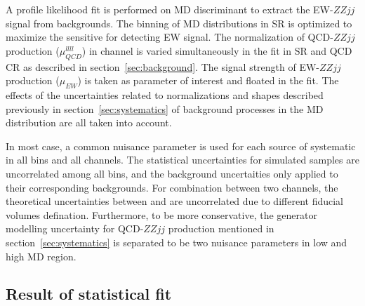 A profile likelihood fit is performed on MD discriminant to extract the EW-$ZZjj$ signal from backgrounds.
The binning of MD distributions in SR is optimized to maximize the sensitive for detecting EW signal.
The normalization of QCD-$ZZjj$ production ($\mu_{QCD}^{llll}$) in \llll channel is varied simultaneously in the fit in SR and QCD CR as described in section~\ref{sec:background}.
The signal strength of EW-$ZZjj$ production ($\mu_{EW}$) is taken as parameter of interest and floated in the fit.
The effects of the uncertainties related to normalizations and shapes described previously in section~\ref{sec:systematics} 
of background processes in the MD distribution are all taken into account.

In most case, a common nuisance parameter is used for each source of systematic in all bins and all channels.
The statistical uncertainties for simulated samples are uncorrelated among all bins, and the background uncertaities only applied to their corresponding backgrounds.
For combination between two channels, the theoretical uncertainties between \llll and \llvv are uncorrelated due to different fiducial volumes defination.
Furthermore, to be more conservative, the generator modelling uncertainty for QCD-$ZZjj$ production mentioned in section~\ref{sec:systematics}
is separated to be two nuisance parameters in low and high MD region.

\subsection{Result of statistical fit}

